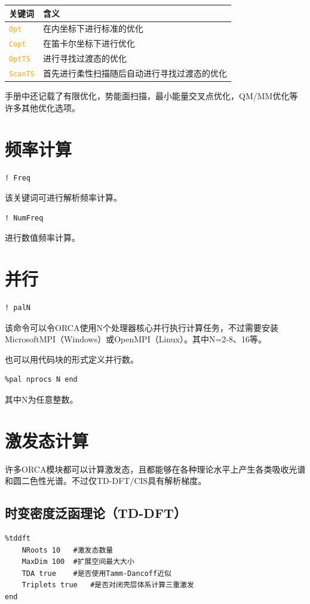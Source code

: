 \documentclass{ctexart}
\newcommand{\cmd}[1]{\textcolor{orange}{ \texttt{#1} }}
\begin{document}
	\begin{table}[H]
		\centering
		\begin{tabular}{ll}
			\toprule
			\textbf{关键词}    & \textbf{含义}                     \\
			\midrule
			\cmd{Opt}    & 在内坐标下进行标准的优化           \\
			\cmd{Copt}   & 在笛卡尔坐标下进行优化            \\
			\cmd{OptTS}  & 进行寻找过渡态的优化             \\
			\cmd{ScanTS} & 首先进行柔性扫描随后自动进行寻找过渡态的优化\\
			\bottomrule
		\end{tabular}
	\end{table}
	
	手册中还记载了有限优化，势能面扫描，最小能量交叉点优化，QM/MM优化等许多其他优化选项。
	
	\section{频率计算} 
	
	\begin{lstlisting}
! Freq
	\end{lstlisting}
	该关键词可进行解析频率计算。
	\begin{lstlisting}
! NumFreq
	\end{lstlisting}
	进行数值频率计算。
	
	\section{并行}
	\begin{lstlisting}
! palN
	\end{lstlisting}
	该命令可以令ORCA使用N个处理器核心并行执行计算任务，不过需要安装MicrosoftMPI（Windows）或OpenMPI（Linux）。其中N=2-8、16等。
	
	也可以用代码块的形式定义并行数。
	\begin{lstlisting}
%pal nprocs N end
	\end{lstlisting}
	其中N为任意整数。
	
	\section{激发态计算} 
	许多ORCA模块都可以计算激发态，且都能够在各种理论水平上产生各类吸收光谱和圆二色性光谱。不过仅TD-DFT/CIS具有解析梯度。
	
	\subsection{时变密度泛函理论（TD-DFT）} 
	\begin{lstlisting}
%tddft 
	NRoots 10	#激发态数量
	MaxDim 100	#扩展空间最大大小
	TDA true	#是否使用Tamm-Dancoff近似
	Triplets true	#是否对闭壳层体系计算三重激发
end
	\end{lstlisting}
	
\end{document}
